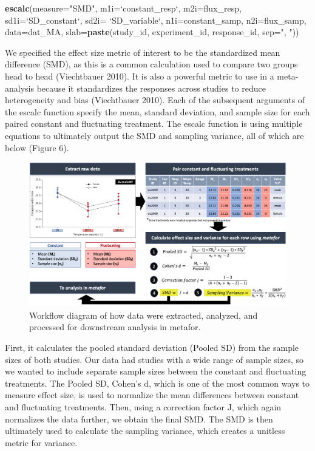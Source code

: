 \documentclass[12pt,twoside]{reedthesis}
\newenvironment{Shaded}{\begin{snugshade}}{\end{snugshade}}
\newcommand{\DataTypeTok}[1]{\textcolor[rgb]{0.13,0.29,0.53}{#1}}
\newcommand{\KeywordTok}[1]{\textcolor[rgb]{0.13,0.29,0.53}{\textbf{#1}}}
\newcommand{\NormalTok}[1]{#1}
\newcommand{\StringTok}[1]{\textcolor[rgb]{0.31,0.60,0.02}{#1}}
\begin{document}
\begin{Shaded}
\begin{Highlighting}[]
\KeywordTok{escalc}\NormalTok{(}\DataTypeTok{measure=}\StringTok{"SMD"}\NormalTok{, }\DataTypeTok{m1i=}\StringTok{`}\DataTypeTok{constant_resp}\StringTok{`}\NormalTok{, }\DataTypeTok{m2i=}\NormalTok{flux_resp, }
            \DataTypeTok{sd1i=}\StringTok{`}\DataTypeTok{SD_constant}\StringTok{`}\NormalTok{, }\DataTypeTok{sd2i=} \StringTok{`}\DataTypeTok{SD_variable}\StringTok{`}\NormalTok{, }\DataTypeTok{n1i=}\NormalTok{constant_samp, }
       \DataTypeTok{n2i=}\NormalTok{flux_samp, }\DataTypeTok{data=}\NormalTok{dat_MA, }\DataTypeTok{slab=}\KeywordTok{paste}\NormalTok{(study_id, experiment_id, }
\NormalTok{                                              response_id, }\DataTypeTok{sep=}\StringTok{", "}\NormalTok{))}
\end{Highlighting}
\end{Shaded}
We specified the effect size metric of interest to be the standardized mean difference (SMD), as this is a common calculation used to compare two groups head to head (Viechtbauer 2010). It is also a powerful metric to use in a meta-analysis because it standardizes the responses across studies to reduce heterogeneity and bias (Viechtbauer 2010). Each of the subsequent arguments of the escalc function specify the mean, standard deviation, and sample size for each paired constant and fluctuating treatment. The escalc function is using multiple equations to ultimately output the SMD and sampling variance, all of which are below (Figure 6).
\begin{figure}
\includegraphics[width=1\linewidth]{figures/figure6} \caption{Workflow diagram of how data were extracted, analyzed, and processed for downstream analysis in metafor.}\label{fig:unnamed-chunk-12}
\end{figure}
First, it calculates the pooled standard deviation (Pooled SD) from the sample sizes of both studies. Our data had studies with a wide range of sample sizes, so we wanted to include separate sample sizes between the constant and fluctuating treatments. The Pooled SD, Cohen's d, which is one of the most common ways to measure effect size, is used to normalize the mean differences between constant and fluctuating treatments. Then, using a correction factor J, which again normalizes the data further, we obtain the final SMD. The SMD is then ultimately used to calculate the sampling variance, which creates a unitless metric for variance.
\end{document}
